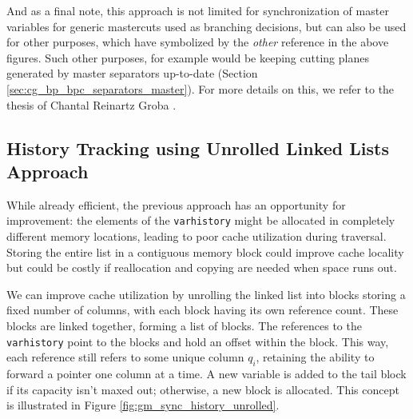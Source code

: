 And as a final note, this approach is not limited for synchronization of master variables for generic mastercuts used as branching decisions, but can also be used for other purposes, which have symbolized by the \textit{other} reference in the above figures. Such other purposes, for example would be keeping cutting planes generated by master separators up-to-date (Section \ref{sec:cg_bp_bpc_separators_master}). For more details on this, we refer to the thesis of Chantal Reinartz Groba \cite{reinartzgroba2024todo}.

\subsection{History Tracking using Unrolled Linked Lists Approach}\label{subsec:gm_sync_history_unrolled}
While already efficient, the previous approach has an opportunity for improvement: the elements of the \texttt{varhistory} might be allocated in completely different memory locations, leading to poor cache utilization during traversal. Storing the entire list in a contiguous memory block could improve cache locality but could be costly if reallocation and copying are needed when space runs out.

We can improve cache utilization by unrolling the linked list into blocks storing a fixed number of columns, with each block having its own reference count. These blocks are linked together, forming a list of blocks. The references to the \texttt{varhistory} point to the blocks and hold an offset within the block. This way, each reference still refers to some unique column $q_i$, retaining the ability to forward a pointer one column at a time. A new variable is added to the tail block if its capacity isn't maxed out; otherwise, a new block is allocated. This concept is illustrated in Figure \ref{fig:gm_sync_history_unrolled}.

